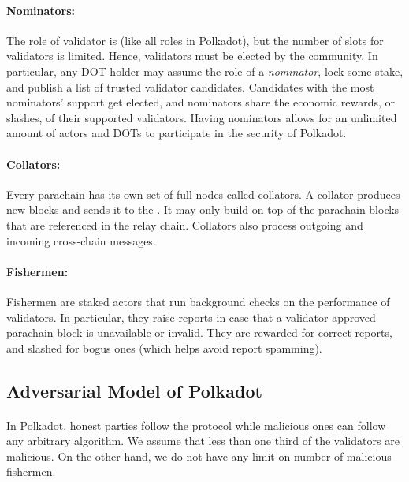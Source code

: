 \paragraph{Nominators:} The role of validator is 
 (like all roles in Polkadot),
but the number of slots for validators is limited. Hence, validators must be elected by the community.
In particular, any DOT holder may assume the role of a \emph{nominator}, lock some stake, and publish a list
of trusted validator candidates. Candidates with the most nominators' support get elected,
and nominators share the economic rewards, or slashes, of their supported validators.
Having nominators allows for an unlimited amount of actors and DOTs to participate in the security of Polkadot.

\paragraph{Collators: } Every parachain has its own set of full nodes called collators.
A collator produces new blocks and sends it to the .
It may only build on top of the parachain blocks that are referenced in the relay chain.
Collators also process outgoing and incoming cross-chain messages.

\paragraph{Fishermen:} Fishermen are staked actors that run background checks on the performance of validators.
In particular, they raise reports in case that a validator-approved parachain block is unavailable or invalid.
They are rewarded for correct reports, and slashed for bogus ones (which helps avoid report spamming).


\subsection{Adversarial Model of Polkadot}

\paragraph{} In Polkadot, honest parties follow the protocol while malicious ones can follow any arbitrary algorithm. We assume that less than one third of the validators are malicious. On the other hand, we do not have any limit on number of malicious fishermen.

